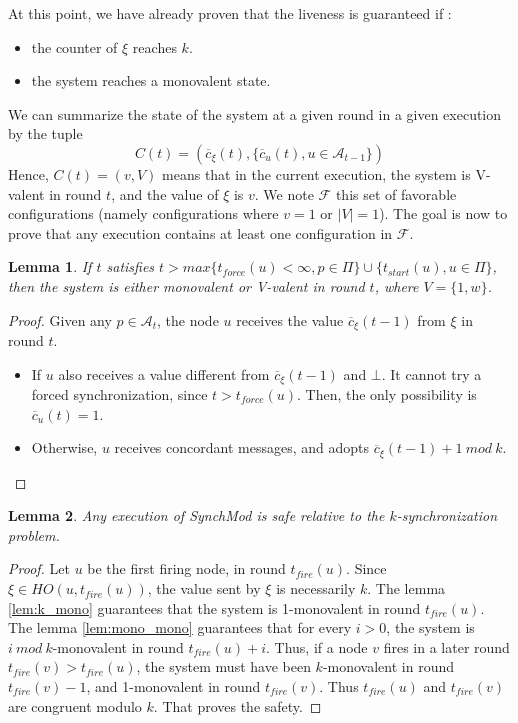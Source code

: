 \documentclass{article}
\newtheorem{lemma}{Lemma}[section]
\begin{document}
\noindent At this point, we have already proven that the liveness is guaranteed if :
\begin{itemize}
	\item the counter of $\xi$ reaches $k$.
	\item the system reaches a monovalent state.
\end{itemize}

We can summarize the state of the system at a given round in a given execution by the tuple
$$C(t) = (\overline{c}_\xi(t), \{\overline{c}_u(t), u \in \mathcal{A}_{t-1}\})$$
Hence, $C(t) = (v, V)$ means that in the current execution, the system is V-valent in round $t$, and the value of $\xi$ is $v$.
We note $\mathcal{F}$ this set of favorable configurations (namely configurations where $v = 1$ or $|V| = 1$).
The goal is now to prove that any execution contains at least one configuration in $\mathcal{F}$.

\begin{lemma}\label{lem:mono_bi}
	If $t$ satisfies $t > max \{t_{force}(u) < \infty, p \in \Pi\} \cup \{t_{start}(u), u \in \Pi\}$,
	then the system is either monovalent or V-valent in round $t$, where $V = \{1, w\}$.
\end{lemma}
\begin{proof}
	Given any $p \in \mathcal{A}_t$, the node $u$ receives the value $\overline{c}_\xi(t-1)$ from $\xi$ in round $t$.
	\begin{itemize}
		\item If $u$ also receives a value different from $\overline{c}_\xi(t-1)$ and $\bot$.
			It cannot try a forced synchronization, since $t > t_{force}(u)$.
			Then, the only possibility is $\overline{c}_u(t) = 1$.
		\item Otherwise, $u$ receives concordant messages, and adopts $\overline{c}_\xi(t-1)+1~mod~k$.
	\end{itemize}
\end{proof}

\begin{lemma}\label{lem:safety}
	Any execution of SynchMod is safe relative to the $k$-synchronization problem.
\end{lemma}
\begin{proof}
	Let $u$ be the first firing node, in round $t_{fire}(u)$.
	Since $\xi \in HO(u,t_{fire}(u))$, the value sent by $\xi$ is necessarily $k$.
	The lemma \ref{lem:k_mono} guarantees that the system is 1-monovalent in round $t_{fire}(u)$.
	The lemma \ref{lem:mono_mono} guarantees that for every $i > 0$, the system is $i~mod~k$-monovalent in round $t_{fire}(u)+i$.
	Thus, if a node $v$ fires in a later round $t_{fire}(v) > t_{fire}(u)$, the system must have been $k$-monovalent in round $t_{fire}(v)-1$,
	and 1-monovalent in round $t_{fire}(v)$. Thus $t_{fire}(u)$ and $t_{fire}(v)$ are congruent modulo $k$.
	That proves the safety.
\end{proof}
\end{document}
